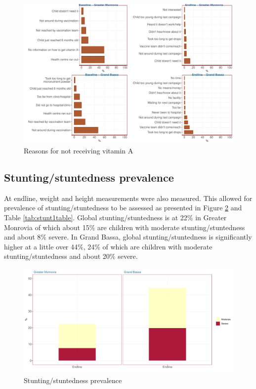 \documentclass[12pt,a4paper]{article}
\begin{document}
\begin{figure}[H]

{\centering \includegraphics{liberiaCoverageFinalReport_files/figure-latex/vit2plot-1} 

}

\caption{Reasons for not receiving vitamin A}\label{fig:vit2plot}
\end{figure}

\newpage

\hypertarget{stuntingstuntedness-prevalence}{%
\subsection{Stunting/stuntedness prevalence}\label{stuntingstuntedness-prevalence}}

At endline, weight and height measurements were also measured. This allowed for prevalence of stunting/stuntedness to be assessed as presented in Figure \ref{fig:stunt1plot} and Table \ref{tab:stunt1table}. Global stunting/stuntedness is at 22\% in Greater Monrovia of which about 15\% are children with moderate stunting/stuntedness and about 8\% severe. In Grand Bassa, global stunting/stuntedness is significantly higher at a little over 44\%, 24\% of which are children with moderate stunting/stuntedness and about 20\% severe.

\begin{figure}[H]

{\centering \includegraphics{liberiaCoverageFinalReport_files/figure-latex/stunt1plot-1} 

}

\caption{Stunting/stuntedness prevalence}\label{fig:stunt1plot}
\end{figure}
\end{document}
